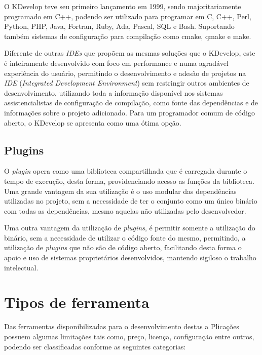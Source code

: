 O KDevelop teve seu primeiro lançamento em 1999, sendo majoritariamente programado em C++, podendo ser utilizado
para programar em C, C++, Perl, Python, PHP, Java, Fortran, Ruby, Ada, Pascal, SQL e Bash. Suportando também sistemas de
configuração para compilação como cmake, qmake e make.

Diferente de outras \textit{IDEs} que propõem as mesmas soluções que o KDevelop, este é inteiramente desenvolvido
com foco em performance e numa agradável experiência do usuário, permitindo o desenvolvimento e adesão de projetos na \textit{IDE} (\textit{Integrated Development Environment}) sem restringir outros ambientes de desenvolvimento, utilizando toda a informação disponível nos sistemas assistencialistas de configuração de compilação, como fonte das dependências e de informações sobre o projeto adicionado. Para um programador comum de código aberto, o KDevelop se apresenta como uma ótima opção.


\subsection{Plugins}
O \textit{plugin} opera como uma biblioteca compartilhada que é carregada durante o tempo de execução, desta forma, providenciando acesso as funções da biblioteca. Uma grande vantagem da sua utilização é o uso modular das dependências utilizadas no projeto, sem a necessidade de ter o conjunto como um único binário com todas as dependências, mesmo aquelas não utilizadas pelo desenvolvedor.

Uma outra vantagem da utilização de \textit{plugins}, é permitir somente a utilização do binário, sem a necessidade de utilizar
o código fonte do mesmo, permitindo, a utilização de \textit{plugins} que não são de código aberto, facilitando desta
forma o apoio e uso de sistemas proprietários desenvolvidos, mantendo sigiloso o trabalho intelectual.

\section{Tipos de ferramenta}
Das ferramentas disponibilizadas para o desenvolvimento destas a Plicações possuem algumas limitações tais como, preço, licença, configuração entre outros, podendo ser classificadas conforme as seguintes categorias:

